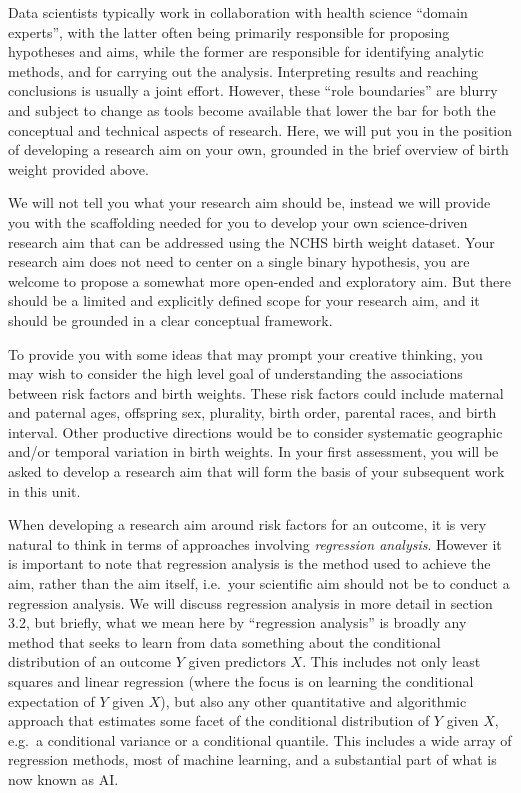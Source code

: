Data scientists typically work in collaboration with health science ``domain experts'', with the latter often being primarily responsible for proposing hypotheses and aims, while the former are responsible for identifying analytic methods, and for carrying out the analysis.  Interpreting results and reaching conclusions is usually a joint effort.  However, these ``role boundaries'' are blurry and subject to change as tools become available that lower the bar for both the conceptual and technical aspects of research.  Here, we will put you in the position of developing a research aim on your own, grounded in the brief overview of birth weight provided above.

We will not tell you what your research aim should be, instead we will provide you with the scaffolding needed for you to develop your own science-driven research aim that can be addressed using the NCHS birth weight dataset.  Your research aim does not need to center on a single binary hypothesis, you are welcome to propose a somewhat more open-ended and exploratory aim.  But there should be a limited and explicitly defined scope for your research aim, and it should be grounded in a clear conceptual framework.

To provide you with some ideas that may prompt your creative thinking, you may wish to consider the high level goal of understanding the associations between risk factors and birth weights.  These risk factors could include maternal and paternal ages, offspring sex, plurality, birth order, parental races, and birth interval.  Other productive directions would be to consider systematic geographic and/or temporal variation in birth weights.  In your first assessment, you will be asked to develop a research aim that will form the basis of your subsequent work in this unit.

When developing a research aim around risk factors for an outcome, it is very natural to think in terms of approaches involving {\em regression analysis}.  However it is important to note that regression analysis is the method used to achieve the aim, rather than the aim itself, i.e.\ your scientific aim should not be to conduct a regression analysis.  We will discuss regression analysis in more detail in section 3.2, but briefly, what we mean here by ``regression analysis'' is broadly any method that seeks to learn from data something about the conditional distribution of an outcome $Y$ given predictors $X$.  This includes not only least squares and linear regression (where the focus is on learning the conditional expectation of $Y$ given $X$), but also any other quantitative and algorithmic approach that estimates some facet of the conditional distribution of $Y$ given $X$, e.g.\ a conditional variance or a conditional quantile.  This includes a wide array of regression methods, most of machine learning, and a substantial part of what is now known as AI.

